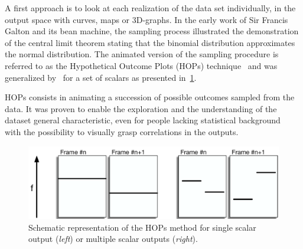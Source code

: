 A first approach is to look at each realization of the data set individually, in the output space with curves, maps or 3D-graphs. In the early work of Sir Francis Galton and its bean machine, the sampling process illustrated the demonstration of the central limit theorem stating that the binomial distribution approximates the normal distribution. The animated version of the sampling procedure is referred to as the Hypothetical Outcome Plots (HOPs) technique~\citep{Ehlschlaeger1997} and was generalized by~\citep{Hullman2015} for a set of scalars as presented in~\cref{fig:pattern_hop}.

HOPs consists in animating a succession of possible outcomes sampled from the data. It was proven to enable the exploration and the understanding of the dataset general characteristic, even for people lacking statistical background~\citep{Belia2005} with the possibility to visually grasp correlations in the outputs. 

\begin{figure}[!h]
\centering
\includegraphics[width=0.8\linewidth,keepaspectratio]{fig/literature/pattern_hop.pdf}
\caption{Schematic representation of the HOPs method for single scalar output (\emph{left}) or multiple scalar outputs (\emph{right}).}
\label{fig:pattern_hop}
\end{figure}

